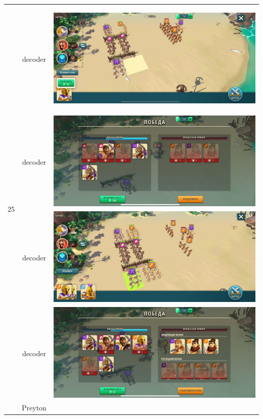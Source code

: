 \begin{longtable}{|c|c|c|}
	\hline
	\multirow{14}{*}{25} & decoder &
	\hypertarget{fight25}{\includegraphics[width=0.75\linewidth]{./parts/media/TreasureHunt/25/decoder/photo_2022-04-13_16-38-53.jpg}} \\
	& decoder &
	\includegraphics[width=0.75\linewidth]{./parts/media/TreasureHunt/25/decoder/photo_2022-04-13_16-38-58.jpg} \\
	& decoder &
	\includegraphics[width=0.75\linewidth]{./parts/media/TreasureHunt/25/decoder/photo_2022-04-13_16-38-30.jpg} \\
	& decoder &
	\includegraphics[width=0.75\linewidth]{./parts/media/TreasureHunt/25/decoder/photo_2022-04-13_16-38-45.jpg} \\
	\hline
	\multirow{6}{*}{26} & Preyton &

\end{longtable}
